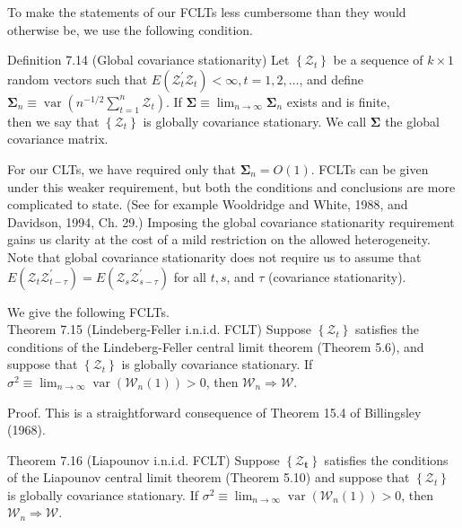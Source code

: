 \documentclass[10pt]{article}
\begin{document}
To make the statements of our FCLTs less cumbersome than they would otherwise be, we use the following condition.

Definition 7.14 (Global covariance stationarity) Let $\left\{\mathcal{Z}_{t}\right\}$ be a sequence of $k \times 1$ random vectors such that $E\left(\mathcal{Z}_{t}^{\prime} \mathcal{Z}_{t}\right)<\infty, t=1,2, \ldots$, and define $\boldsymbol{\Sigma}_{n} \equiv \operatorname{var}\left(n^{-1 / 2} \sum_{t=1}^{n} \boldsymbol{\mathcal { Z }}_{t}\right)$. If $\boldsymbol{\Sigma} \equiv \lim _{n \rightarrow \infty} \boldsymbol{\Sigma}_{n}$ exists and is finite,\\
then we say that $\left\{\mathcal{Z}_{t}\right\}$ is globally covariance stationary. We call $\boldsymbol{\Sigma}$ the global covariance matrix.

For our CLTs, we have required only that $\boldsymbol{\Sigma}_{n}=O(1)$. FCLTs can be given under this weaker requirement, but both the conditions and conclusions are more complicated to state. (See for example Wooldridge and White, 1988, and Davidson, 1994, Ch. 29.) Imposing the global covariance stationarity requirement gains us clarity at the cost of a mild restriction on the allowed heterogeneity. Note that global covariance stationarity does not require us to assume that $E\left(\mathcal{Z}_{t} \mathcal{Z}_{t-\tau}^{\prime}\right)=E\left(\mathcal{Z}_{s} \mathcal{Z}_{s-\tau}^{\prime}\right)$ for all $t, s$, and $\tau$ (covariance stationarity).

We give the following FCLTs.\\
Theorem 7.15 (Lindeberg-Feller i.n.i.d. FCLT) Suppose $\left\{\mathcal{Z}_{t}\right\}$ satisfies the conditions of the Lindeberg-Feller central limit theorem (Theorem 5.6), and suppose that $\left\{\mathcal{Z}_{t}\right\}$ is globally covariance stationary. If $\sigma^{2} \equiv \lim _{n \rightarrow \infty} \operatorname{var}\left(\mathcal{W}_{n}(1)\right)>0$, then $\mathcal{W}_{n} \Rightarrow \mathcal{W}$.

Proof. This is a straightforward consequence of Theorem 15.4 of Billingsley (1968).

Theorem 7.16 (Liapounov i.n.i.d. FCLT) Suppose $\left\{\mathcal{Z}_{\boldsymbol{t}}\right\}$ satisfies the conditions of the Liapounov central limit theorem (Theorem 5.10) and suppose that $\left\{\mathcal{Z}_{t}\right\}$ is globally covariance stationary. If $\sigma^{2} \equiv \lim _{n \rightarrow \infty} \operatorname{var}\left(\mathcal{W}_{n}(1)\right) >0$, then $\mathcal{W}_{n} \Rightarrow \mathcal{W}$.
\end{document}
